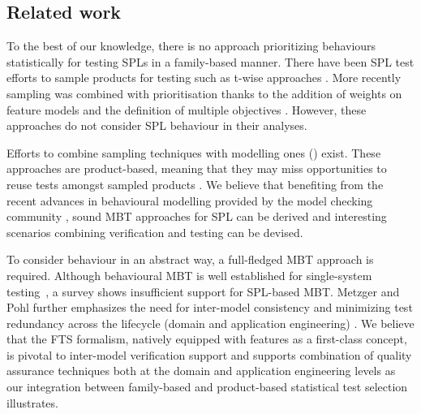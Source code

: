 \subsection{Related work}

To the best of our knowledge, there is no approach prioritizing behaviours statistically for testing SPLs in a family-based manner.  
There have been SPL test efforts to sample products for testing such as t-wise approaches \cite{Perrouin2011,Cohen2006,Cohen2008,Johansen2012}. More recently sampling was combined with prioritisation thanks to the addition of weights on feature models and the definition of multiple objectives \cite{Johansen2012b,Henard2014a}. However, these approaches do not consider SPL behaviour in their analyses.  

Efforts to combine sampling techniques with modelling ones (\eg \cite{Lochau2011}) exist.  These approaches are product-based, meaning that they may miss opportunities to reuse tests amongst sampled products \cite{VonRhein2013}. We believe that benefiting from the recent advances in behavioural modelling provided by the model checking community \cite{Asirelli2011,Asirelli2011a,Classen2011,Classen2013b,Fischbein2006,Lauenroth2009,Rodrigues2015,terBeek2016}, sound MBT approaches for SPL can be derived and interesting scenarios combining verification and testing can be devised.

To consider behaviour in an abstract way, a full-fledged MBT approach \cite{Utting2007} is required. Although behavioural MBT is well established for single-system testing~\cite{Tretmans2008}, a survey  \cite{Oster2011} shows insufficient support for SPL-based MBT. Metzger and Pohl further emphasizes the need for inter-model consistency  and minimizing test redundancy  across the lifecycle (domain and application engineering) \cite{Metzger2014}. We believe that the FTS formalism, natively equipped with features as a first-class concept, is pivotal  to inter-model verification support and supports combination of quality assurance techniques both at the domain and application engineering levels as our integration between family-based and product-based statistical test selection illustrates.  


